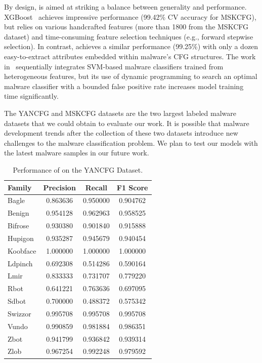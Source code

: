 By design, \sysname is aimed at striking a balance between generality and performance.
XGBoost~\cite{NovelFeatureFusion} achieves impressive performance (99.42\% CV accuracy for MSKCFG), but relies on various handcrafted features (more than 1800 from the MSKCFG dataset) and time-consuming feature selection techniques (e.g., forward stepwise selection).
In contrast, \sysname achieves a similar performance (99.25\%) with only a dozen easy-to-extract attributes embedded within malware’s CFG structures.
The work in~\cite{YanDataset} sequentially integrates SVM-based malware classifiers trained from heterogeneous features,
but its use of dynamic programming to search an optimal malware classifier with a bounded false positive rate increases model training time significantly.

The YANCFG and MSKCFG datasets are the two largest labeled malware datasets that we could obtain to evaluate our work.
It is possible that malware development trends after the collection of these two datasets introduce new challenges to the malware classification problem.
We plan to test our models with the latest malware samples in our future work.


\begin{table}
    \caption{Performance of \sysname on the YANCFG Dataset.}
    \begin{center}
        \begin{tabular}{lccc}
            \hline
            \hline
            Family &  Precision &    Recall &  F1 Score \\
            \hline
            Bagle &   0.863636 &  0.950000 &  0.904762 \\
            Benign &   0.954128 &  0.962963 &  0.958525 \\
            Bifrose &   0.930380 &  0.901840 &  0.915888 \\
            Hupigon &   0.935287 &  0.945679 &  0.940454 \\
            Koobface &   1.000000 &  1.000000 &  1.000000 \\
            Ldpinch &   0.692308 &  0.514286 &  0.590164 \\
            Lmir &   0.833333 &  0.731707 &  0.779220 \\
            Rbot &   0.641221 &  0.763636 &  0.697095 \\
            Sdbot &   0.700000 &  0.488372 &  0.575342 \\
            Swizzor &   0.995708 &  0.995708 &  0.995708 \\
            Vundo &   0.990859 &  0.981884 &  0.986351 \\
            Zbot &   0.941799 &  0.936842 &  0.939314 \\
            Zlob &   0.967254 &  0.992248 &  0.979592 \\
            \hline
        \end{tabular}
    \end{center}
    \label{MG:Tab:YANCFGScores}
\end{table}

